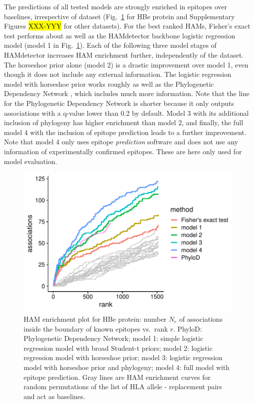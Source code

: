 \documentclass{bioinfo}
\begin{document}
The predictions of all tested models are strongly enriched in epitopes over baselines, irrespective of dataset (Fig.~\ref{fig:comparison} for HBe protein and Supplementary Figures \hl{XXX-YYY} for other datasets). For the best ranked HAMs, Fisher's exact test performs about as well as the HAMdetector backbone logistic regression model (model 1 in Fig.~\ref{fig:comparison}). Each of the following three model stages of HAMdetector increases HAM enrichment further, independently of the dataset.
The horseshoe prior alone (model 2) is a drastic improvement over model 1, even though it does not include any external information. The logistic regression model with horseshoe prior works roughly as well as the Phylogenetic Dependency Network \cite{Carlson2008}, which includes much more information. Note that the line for the Phylogenetic Dependency Network is shorter because it only outputs associations with a q-value lower than 0.2 by default. Model 3 with its additional inclusion of phylogeny has higher enrichment than model 2, and finally, the full model 4 with the inclusion of epitope prediction leads to a further improvement. Note that model 4 only uses epitope \textit{prediction} software and does not use any information of experimentally confirmed epitopes. These are here only used for model evaluation.

\begin{figure}[ht!]
  \includegraphics[width=1\linewidth]{plots/comparison.pdf}
  \caption{HAM enrichment plot for HBe protein: number $N_e$ of associations inside the boundary of known epitopes vs.\ rank $r$. PhyloD: Phylogenetic Dependency Network; model 1: simple logistic regression model with broad Student-t priors; model 2: logistic regression model with horseshoe prior; model 3: logistic regression model with horseshoe prior and phylogeny; model 4: full model with epitope prediction. Gray lines are HAM enrichment curves for random permutations of the list of HLA allele - replacement pairs and act as baselines.}
  \label{fig:comparison}
\end{figure}
\end{document}
